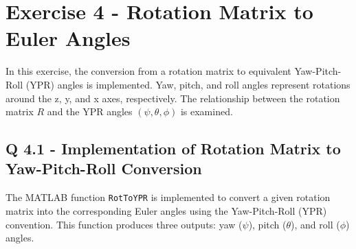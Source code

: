 \section{Exercise 4 - Rotation Matrix to Euler Angles} \label{P4}

In this exercise, the conversion from a rotation matrix to equivalent Yaw-Pitch-Roll (YPR) angles is implemented. Yaw, pitch, and roll angles represent rotations around the z, y, and x axes, respectively. The relationship between the rotation matrix \( R \) and the YPR angles \( (\psi, \theta, \phi) \) is examined.

\subsection{Q 4.1 - Implementation of Rotation Matrix to Yaw-Pitch-Roll Conversion}

The MATLAB function \texttt{RotToYPR} is implemented to convert a given rotation matrix into the corresponding Euler angles using the Yaw-Pitch-Roll (YPR) convention. This function produces three outputs: yaw (\(\psi\)), pitch (\(\theta\)), and roll (\(\phi\)) angles. 

